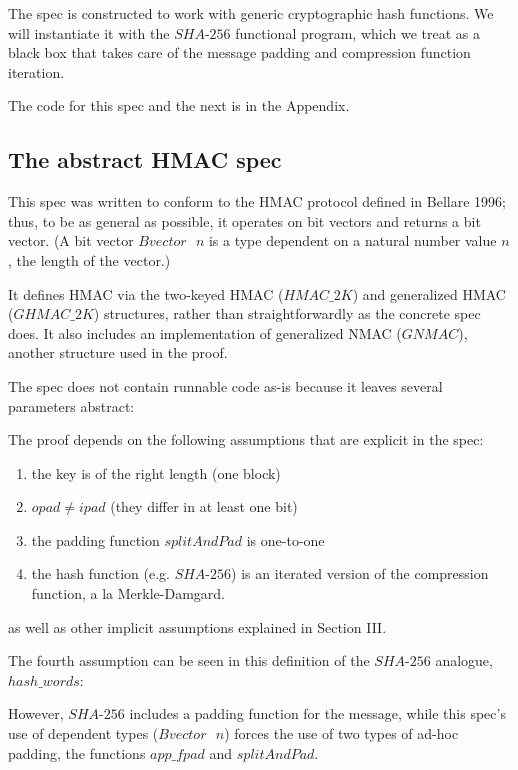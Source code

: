 \documentclass[twocolumn,showpacs,%
  nofootinbib,aps,superscriptaddress,%
  eqsecnum,prd,notitlepage,showkeys,10pt]{revtex4-1}
\begin{document}
The spec is constructed to work with generic cryptographic hash functions. We will instantiate it with the $SHA$-$256$ functional program, which we treat as a black box that takes care of the message padding and compression function iteration.

The code for this spec and the next is in the Appendix.

\subsection{The abstract HMAC spec}

This spec was written to conform to the HMAC protocol defined in Bellare 1996; thus, to be as general as possible, it operates on bit vectors and returns a bit vector. (A bit vector $Bvector \textrm{ } n$ is a type dependent on a natural number value $n$, the length of the vector.)

It defines HMAC via the two-keyed HMAC ($HMAC\_2K$) and generalized HMAC ($GHMAC\_2K$) structures, rather than straightforwardly as the concrete spec does. It also includes an implementation of generalized NMAC ($GNMAC$), another structure used in the proof.

The spec does not contain runnable code as-is because it leaves several parameters abstract:




The proof depends on the following assumptions that are explicit in the spec:
\begin{enumerate}
\item the key is of the right length (one block)
\item $opad \neq ipad$ (they differ in at least one bit)
\item the padding function $splitAndPad$ is one-to-one
\item the hash function (e.g. $SHA$-$256$) is an iterated version of the compression function, a la Merkle-Damgard.
\end{enumerate}

as well as other implicit assumptions explained in Section III.

The fourth assumption can be seen in this definition of the $SHA$-$256$ analogue, $hash\_words$:



However, $SHA$-$256$ includes a padding function for the message, while this spec's use of dependent types ($Bvector \textrm{ } n$) forces the use of two types of ad-hoc padding, the functions $app\_fpad$ and $splitAndPad$. 
\end{document}
